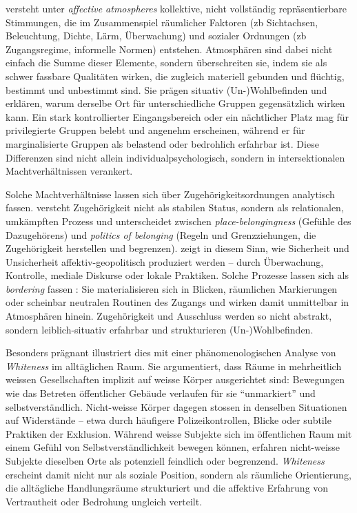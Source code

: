 \textcite{andersonAffectiveAtmospheres2009} versteht unter \emph{affective atmospheres} kollektive, nicht vollständig repräsentierbare Stimmungen, die im Zusammenspiel räumlicher Faktoren (\gls{zb} Sichtachsen, Beleuchtung, Dichte, Lärm, Überwachung) und sozialer Ordnungen (\gls{zb} Zugangsregime, informelle Normen) entstehen. Atmosphären sind dabei nicht einfach die Summe dieser Elemente, sondern überschreiten sie, indem sie als schwer fassbare Qualitäten wirken, die zugleich materiell gebunden und flüchtig, bestimmt und unbestimmt sind. Sie prägen situativ (Un-)Wohlbefinden und erklären, warum derselbe Ort für unterschiedliche Gruppen gegensätzlich wirken kann. Ein stark kontrollierter Eingangsbereich oder ein nächtlicher Platz mag für privilegierte Gruppen belebt und angenehm erscheinen, während er für marginalisierte Gruppen als belastend oder bedrohlich erfahrbar ist. Diese Differenzen sind nicht allein individualpsychologisch, sondern in intersektionalen Machtverhältnissen verankert.

Solche Machtverhältnisse lassen sich über Zugehörigkeitsordnungen analytisch fassen. \textcite{antonsichSearchingBelongingAnalytical2010} versteht Zugehörigkeit nicht als stabilen Status, sondern als relationalen, umkämpften Prozess und unterscheidet zwischen \emph{place-belongingness} (Gefühle des Dazugehörens) und \emph{politics of belonging} (Regeln und Grenzziehungen, die Zugehörigkeit herstellen und begrenzen). \textcite{painGlobalizedFearEmotional2009} zeigt in diesem Sinn, wie Sicherheit und Unsicherheit affektiv-geopolitisch produziert werden -- durch Überwachung, Kontrolle, mediale Diskurse oder lokale Praktiken. Solche Prozesse lassen sich als \emph{bordering} fassen \parencite[\gls{vgl}][]{yuval-davisBelongingPoliticsBelonging2006}: Sie materialisieren sich in Blicken, räumlichen Markierungen oder scheinbar neutralen Routinen des Zugangs und wirken damit unmittelbar in Atmosphären hinein. Zugehörigkeit und Ausschluss werden so nicht abstrakt, sondern leiblich-situativ erfahrbar und strukturieren (Un-)Wohlbefinden.

Besonders prägnant illustriert dies \textcite{ahmedPhenomenologyWhiteness2007} mit einer phänomenologischen Analyse von \emph{Whiteness} im alltäglichen Raum. Sie argumentiert, dass Räume in mehrheitlich weissen Gesellschaften implizit auf weisse Körper ausgerichtet sind: Bewegungen wie das Betreten öffentlicher Gebäude verlaufen für sie \enquote{unmarkiert} und selbstverständlich. Nicht-weisse Körper dagegen stossen in denselben Situationen auf Widerstände -- etwa durch häufigere Polizeikontrollen, Blicke oder subtile Praktiken der Exklusion. Während weisse Subjekte sich im öffentlichen Raum mit einem Gefühl von Selbstverständlichkeit bewegen können, erfahren nicht-weisse Subjekte dieselben Orte als potenziell feindlich oder begrenzend. \emph{Whiteness} erscheint damit nicht nur als soziale Position, sondern als räumliche Orientierung, die alltägliche Handlungsräume strukturiert und die affektive Erfahrung von Vertrautheit oder Bedrohung ungleich verteilt.

